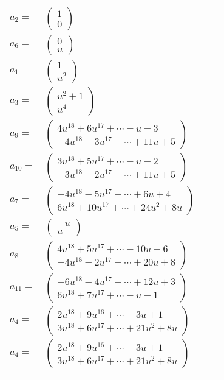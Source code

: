 \documentclass[1p]{elsarticle_modified}
\theoremstyle{definition}
\begin{document}
\begin{tabular}{m{7pt} m{180pt} m{7pt} m{180pt} }
\flushright $a_{2}=$&$\begin{pmatrix}1\\0\end{pmatrix}$ \\
\flushright $a_{6}=$&$\begin{pmatrix}0\\u\end{pmatrix}$ \\
\flushright $a_{1}=$&$\begin{pmatrix}1\\u^2\end{pmatrix}$ \\
\flushright $a_{3}=$&$\begin{pmatrix}u^2+1\\u^4\end{pmatrix}$ \\
\flushright $a_{9}=$&$\begin{pmatrix}4 u^{18}+6 u^{17}+\cdots- u-3\\-4 u^{18}-3 u^{17}+\cdots+11 u+5\end{pmatrix}$ \\
\flushright $a_{10}=$&$\begin{pmatrix}3 u^{18}+5 u^{17}+\cdots- u-2\\-3 u^{18}-2 u^{17}+\cdots+11 u+5\end{pmatrix}$ \\
\flushright $a_{7}=$&$\begin{pmatrix}-4 u^{18}-5 u^{17}+\cdots+6 u+4\\6 u^{18}+10 u^{17}+\cdots+24 u^2+8 u\end{pmatrix}$ \\
\flushright $a_{5}=$&$\begin{pmatrix}- u\\u\end{pmatrix}$ \\
\flushright $a_{8}=$&$\begin{pmatrix}4 u^{18}+5 u^{17}+\cdots-10 u-6\\-4 u^{18}-2 u^{17}+\cdots+20 u+8\end{pmatrix}$ \\
\flushright $a_{11}=$&$\begin{pmatrix}-6 u^{18}-4 u^{17}+\cdots+12 u+3\\6 u^{18}+7 u^{17}+\cdots- u-1\end{pmatrix}$ \\
\flushright $a_{4}=$&$\begin{pmatrix}2 u^{18}+9 u^{16}+\cdots-3 u+1\\3 u^{18}+6 u^{17}+\cdots+21 u^2+8 u\end{pmatrix}$\\ \flushright $a_{4}=$&$\begin{pmatrix}2 u^{18}+9 u^{16}+\cdots-3 u+1\\3 u^{18}+6 u^{17}+\cdots+21 u^2+8 u\end{pmatrix}$\\&\end{tabular}
\end{document}
